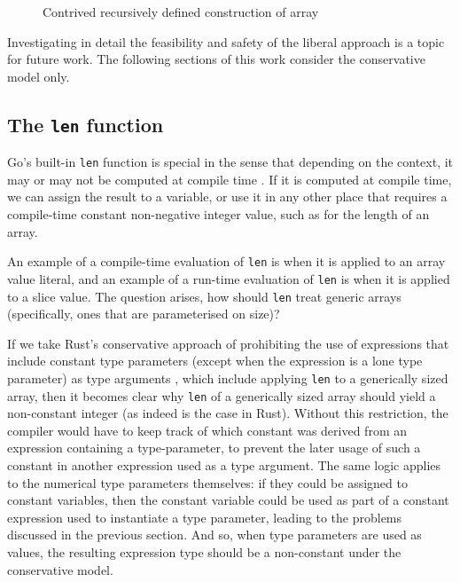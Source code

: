 \begin{figure}
    \caption{Contrived recursively defined construction of array}
    \label{fig:strange-arr-init}
\end{figure}

Investigating in detail the feasibility and safety of the liberal approach
is a topic for future work. The following sections of this work consider the
conservative model only.

\subsection{The \texttt{len} function}

Go's built-in \texttt{len} function is special in the sense that depending on
the context, it may or may not be computed at compile time \autocite{spec}. If
it is computed at compile time, we can assign the result to a 
variable, or use it in any other place that requires a compile-time constant
non-negative integer value, such as for the length of an array.

An example of a compile-time evaluation of \texttt{len} is when it is applied to
an array value literal, and an example of a run-time evaluation of \texttt{len}
is when it is applied to a slice value. The question arises, how should
\texttt{len} treat generic arrays (specifically, ones that are parameterised on
size)?

If we take Rust's conservative approach of prohibiting the use of expressions
that include constant type parameters (except when the expression is a lone type
parameter) as type arguments \autocite{rustConstBlog}, which include applying
\texttt{len} to a generically sized array, then it becomes clear why
\texttt{len} of a generically sized array should yield a non-constant integer
(as indeed is the case in Rust). Without this restriction, the compiler would
have to keep track of which constant was derived from an expression containing a
type-parameter, to prevent the later usage of such a constant in another
 expression used as a type argument. The same logic applies to the
numerical type parameters themselves: if they could be assigned to constant
variables, then the constant variable could be used as part of a constant
expression used to instantiate a  type parameter, leading to the
problems discussed in the previous section. And so, when  type
parameters are used as values, the resulting expression type should be a
non-constant  under the conservative model.


